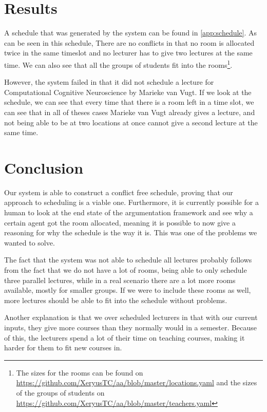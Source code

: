 \section{Results}
A schedule that was generated by the system can be found in
\autoref{app:schedule}. As can be seen in this schedule, There are no
conflicts in that no room is allocated twice in the same timeslot and no
lecturer has to give two lectures at the same time. We can also see that
all the groups of students fit into the rooms\footnote{The sizes for the
    rooms can be found on
    \url{https://github.com/XeryusTC/aa/blob/master/locations.yaml} and the
    sizes of the groups of students on
    \url{https://github.com/XeryusTC/aa/blob/master/teachers.yaml}}.

However, the system failed in that it did not schedule a lecture for
Computational Cognitive Neuroscience by Marieke van Vugt. If we look at
the schedule, we can see that every time that there is a room left in a
time slot, we can see that in all of theses cases Marieke van Vugt already
gives a lecture, and not being able to be at two locations at once cannot
give a second lecture at the same time. 

\section{Conclusion}
Our system is able to construct a conflict free schedule, proving that our
approach to scheduling is a viable one. Furthermore, it is currently
possible for a human to look at the end state of the argumentation
framework and see why a certain agent got the room allocated, meaning it is
possible to now give a reasoning for why the schedule is the way it is.
This was one of the problems we wanted to solve.

The fact that the system was not able to schedule all lectures probably
follows from the fact that we do not have a lot of rooms, being able to
only schedule three parallel lectures, while in a real scenario there are a
lot more rooms available, mostly for smaller groups. If we were to include
these rooms as well, more lectures should be able to fit into the schedule
without problems.

Another explanation is that we over scheduled lecturers in that with our
current inputs, they give more courses than they normally would in a
semester. Because of this, the lecturers spend a lot of their time on
teaching courses, making it harder for them to fit new courses in. 
